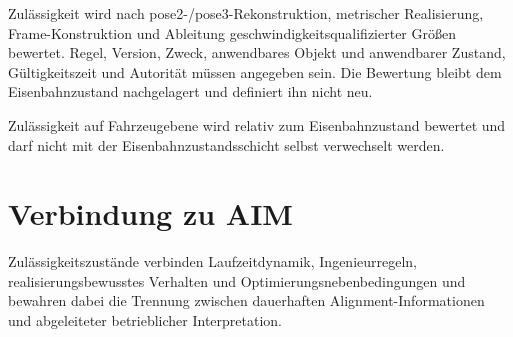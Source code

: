 Zulässigkeit wird nach pose2-/pose3-Rekonstruktion, metrischer Realisierung,
Frame-Konstruktion und Ableitung geschwindigkeitsqualifizierter Größen
bewertet. Regel, Version, Zweck, anwendbares Objekt und anwendbarer Zustand,
Gültigkeitszeit und Autorität müssen angegeben sein. Die Bewertung bleibt dem
Eisenbahnzustand nachgelagert und definiert ihn nicht neu.

Zulässigkeit auf Fahrzeugebene wird relativ zum Eisenbahnzustand bewertet und
darf nicht mit der Eisenbahnzustandsschicht selbst verwechselt werden.

\section{Verbindung zu AIM}

\begin{summary}
Zulässigkeitszustände verbinden Laufzeitdynamik, Ingenieurregeln,
realisierungsbewusstes Verhalten und Optimierungsnebenbedingungen und
bewahren dabei die Trennung zwischen dauerhaften Alignment-Informationen und
abgeleiteter betrieblicher Interpretation.
\end{summary}
